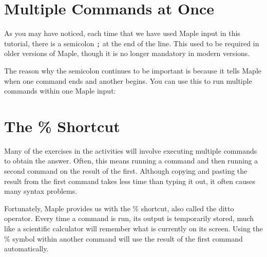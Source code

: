 \section{Multiple Commands at Once}

As you may have noticed, each time that we have used Maple input in this tutorial, there is a semicolon \texttt{;} at the end of the line. This used to be required in older versions of Maple, though it is no longer mandatory in modern versions.


The reason why the semicolon continues to be important is because it tells Maple when one command ends and another begins. You can use this to run multiple commands within one Maple input:

\begin{maplegroup}
\begin{mapleinput}
\end{mapleinput}
\mapleresult
\begin{maplelatex}
\end{maplelatex}
\begin{maplelatex}
\end{maplelatex}
\end{maplegroup}

\section{The \% Shortcut}\label{percentage}


Many of the exercises in the activities will involve executing multiple commands to obtain the answer. Often, this means running a command and then running a second command on the result of the first. Although copying and pasting the result from the first command takes less time than typing it out, it often causes many syntax problems.

Fortunately, Maple provides us with the \% shortcut, also called the ditto operator. Every time a command is run, its output is temporarily stored, much like a scientific calculator will remember what is currently on its screen. Using the \% symbol within another command will use the result of the first command automatically. 

